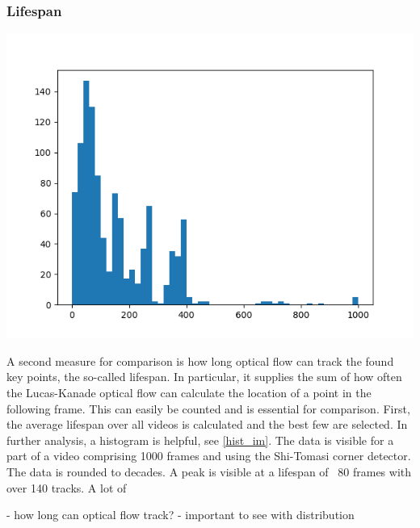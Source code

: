 \documentclass[Bachelorarbeit.tex]{subfiles}
\begin{document}
\subsubsection*{Lifespan}
\label{lifespan}
\begin{center}
	\includegraphics[width=0.7\linewidth]{Images/hist_proto}
	
	\label{hist_im}
\end{center}
A second measure for comparison is how long optical flow can track the found key points, the so-called lifespan. In particular, it supplies the sum of how often the Lucas-Kanade optical flow can calculate the location of a point in the following frame. This can easily be counted and is essential for comparison. First, the average lifespan over all videos is calculated and the best few are selected. In further analysis, a histogram is helpful, see \autoref{hist_im}. The data is visible for a part of a video comprising 1000 frames and using the Shi-Tomasi corner detector. The data is rounded to decades. A peak is visible at a lifespan of ~80 frames with over 140 tracks. A lot of





- how long can optical flow track?
- important to see with distribution
\end{document}
